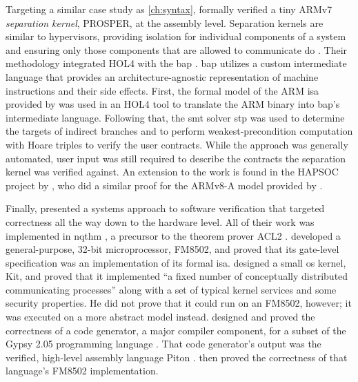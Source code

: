 Targeting a similar case study as \cref{ch:syntax},
\textcite{dam2013hypervisor,dam2013formal}
formally verified a tiny ARMv7 \emph{separation kernel},%
PROSPER, at the assembly level.
Separation kernels are similar to hypervisors,
providing isolation for individual components of a system and ensuring
only those components that are allowed to communicate do \autocite{rushby1981dvss}.
Their methodology integrated HOL4 with the \ac{bap} \autocite{brumley2011bap}.
\Ac{bap} utilizes a custom intermediate language
that provides an architecture-agnostic representation of machine instructions
and their side effects.
First, the formal model of the ARM \ac{isa} provided by \textcite{fox2010arm} was used
in an HOL4 tool to translate the ARM binary into \ac{bap}'s intermediate language.
Following that, the \ac{smt} solver \ac{stp}  \autocite{ganesh2007stp}
was used to determine the targets of indirect branches
and to perform weakest-precondition computation with Hoare triples
to verify the user contracts.
While the approach was generally automated,
user input was still required to describe the contracts
the separation kernel was verified against.
An extension to the work is found in the HAPSOC project by \textcite{baumann2016high},
who did a similar proof for the ARMv8-A model provided by \textcite{fox2015improved}.

Finally, \textcite{bevier1989approach} presented a systems approach to software verification
that targeted correctness all the way down to the hardware level.
All of their work was implemented in \ac{nqthm} \autocite{boyer1979computational},
a precursor to the theorem prover ACL2 \autocite{ACL2}.
\Textcite{hunt1989microprocessor} developed a general-purpose, 32-bit microprocessor,
FM8502, and proved that its gate-level specification
was an implementation of its formal \ac{isa}.
\Textcite{bevier1989short,bevier1989kit,bevier1987verified}
designed a small \ac{os} kernel, Kit, and proved that it implemented
``a fixed number of conceptually distributed communicating processes''
along with a set of typical kernel services and some security properties.
He did not prove that it could run on an FM8502, however;
it was executed on a more abstract model instead.
\Textcite{young1989generator} designed and proved the correctness of a code generator,
a major compiler component, for a subset of the Gypsy 2.05 programming language
\autocite{good1986gypsy}. That code generator's output was
the verified, high-level assembly language Piton \autocite{moore1988piton}.
\Textcite{moore1989language} then proved the correctness
of that language's FM8502 implementation.


